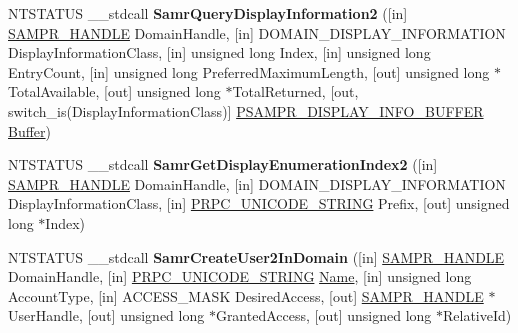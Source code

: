 \begin{DoxyCompactItemize}
\item 
\mbox{\label{interfacesamr_adbe2d1df4d1cbee3a7574f24fbcf0d8b}} 
N\+T\+S\+T\+A\+T\+US \+\_\+\+\_\+stdcall {\bfseries Samr\+Query\+Display\+Information2} (\mbox{[}in\mbox{]} \hyperlink{interfacevoid}{S\+A\+M\+P\+R\+\_\+\+H\+A\+N\+D\+LE} Domain\+Handle, \mbox{[}in\mbox{]} D\+O\+M\+A\+I\+N\+\_\+\+D\+I\+S\+P\+L\+A\+Y\+\_\+\+I\+N\+F\+O\+R\+M\+A\+T\+I\+ON Display\+Information\+Class, \mbox{[}in\mbox{]} unsigned long Index, \mbox{[}in\mbox{]} unsigned long Entry\+Count, \mbox{[}in\mbox{]} unsigned long Preferred\+Maximum\+Length, \mbox{[}out\mbox{]} unsigned long $\ast$Total\+Available, \mbox{[}out\mbox{]} unsigned long $\ast$Total\+Returned, \mbox{[}out, switch\+\_\+is(Display\+Information\+Class)\mbox{]} \hyperlink{union___s_a_m_p_r___d_i_s_p_l_a_y___i_n_f_o___b_u_f_f_e_r}{P\+S\+A\+M\+P\+R\+\_\+\+D\+I\+S\+P\+L\+A\+Y\+\_\+\+I\+N\+F\+O\+\_\+\+B\+U\+F\+F\+ER} \hyperlink{class_buffer}{Buffer})
\item 
\mbox{\label{interfacesamr_acdb7c67b7de2a417754491ce26d9c436}} 
N\+T\+S\+T\+A\+T\+US \+\_\+\+\_\+stdcall {\bfseries Samr\+Get\+Display\+Enumeration\+Index2} (\mbox{[}in\mbox{]} \hyperlink{interfacevoid}{S\+A\+M\+P\+R\+\_\+\+H\+A\+N\+D\+LE} Domain\+Handle, \mbox{[}in\mbox{]} D\+O\+M\+A\+I\+N\+\_\+\+D\+I\+S\+P\+L\+A\+Y\+\_\+\+I\+N\+F\+O\+R\+M\+A\+T\+I\+ON Display\+Information\+Class, \mbox{[}in\mbox{]} \hyperlink{struct___r_p_c___u_n_i_c_o_d_e___s_t_r_i_n_g}{P\+R\+P\+C\+\_\+\+U\+N\+I\+C\+O\+D\+E\+\_\+\+S\+T\+R\+I\+NG} Prefix, \mbox{[}out\mbox{]} unsigned long $\ast$Index)
\item 
\mbox{\label{interfacesamr_aee7bd857f0d138b34be776c45847e1d5}} 
N\+T\+S\+T\+A\+T\+US \+\_\+\+\_\+stdcall {\bfseries Samr\+Create\+User2\+In\+Domain} (\mbox{[}in\mbox{]} \hyperlink{interfacevoid}{S\+A\+M\+P\+R\+\_\+\+H\+A\+N\+D\+LE} Domain\+Handle, \mbox{[}in\mbox{]} \hyperlink{struct___r_p_c___u_n_i_c_o_d_e___s_t_r_i_n_g}{P\+R\+P\+C\+\_\+\+U\+N\+I\+C\+O\+D\+E\+\_\+\+S\+T\+R\+I\+NG} \hyperlink{struct_name_rec__}{Name}, \mbox{[}in\mbox{]} unsigned long Account\+Type, \mbox{[}in\mbox{]} A\+C\+C\+E\+S\+S\+\_\+\+M\+A\+SK Desired\+Access, \mbox{[}out\mbox{]} \hyperlink{interfacevoid}{S\+A\+M\+P\+R\+\_\+\+H\+A\+N\+D\+LE} $\ast$User\+Handle, \mbox{[}out\mbox{]} unsigned long $\ast$Granted\+Access, \mbox{[}out\mbox{]} unsigned long $\ast$Relative\+Id)
\item 
\mbox{\label{interfacesamr_a1306ebcba269e2f8c8e6e66ff7bd6bf0}} 

\end{DoxyCompactItemize}
